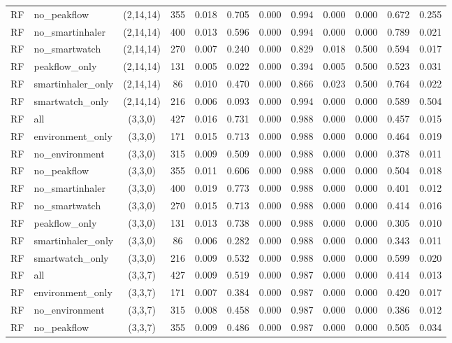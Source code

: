 \begin{longtable}{llcccccccccc}
RF & no\_peakflow & (2,14,14) & 355 & 0.018 & 0.705 & 0.000 & 0.994 & 0.000 & 0.000 & 0.672 & 0.255 \\
RF & no\_smartinhaler & (2,14,14) & 400 & 0.013 & 0.596 & 0.000 & 0.994 & 0.000 & 0.000 & 0.789 & 0.021 \\
RF & no\_smartwatch & (2,14,14) & 270 & 0.007 & 0.240 & 0.000 & 0.829 & 0.018 & 0.500 & 0.594 & 0.017 \\
RF & peakflow\_only & (2,14,14) & 131 & 0.005 & 0.022 & 0.000 & 0.394 & 0.005 & 0.500 & 0.523 & 0.031 \\
RF & smartinhaler\_only & (2,14,14) & 86 & 0.010 & 0.470 & 0.000 & 0.866 & 0.023 & 0.500 & 0.764 & 0.022 \\
RF & smartwatch\_only & (2,14,14) & 216 & 0.006 & 0.093 & 0.000 & 0.994 & 0.000 & 0.000 & 0.589 & 0.504 \\
RF & all & (3,3,0) & 427 & 0.016 & 0.731 & 0.000 & 0.988 & 0.000 & 0.000 & 0.457 & 0.015 \\
RF & environment\_only & (3,3,0) & 171 & 0.015 & 0.713 & 0.000 & 0.988 & 0.000 & 0.000 & 0.464 & 0.019 \\
RF & no\_environment & (3,3,0) & 315 & 0.009 & 0.509 & 0.000 & 0.988 & 0.000 & 0.000 & 0.378 & 0.011 \\
RF & no\_peakflow & (3,3,0) & 355 & 0.011 & 0.606 & 0.000 & 0.988 & 0.000 & 0.000 & 0.504 & 0.018 \\
RF & no\_smartinhaler & (3,3,0) & 400 & 0.019 & 0.773 & 0.000 & 0.988 & 0.000 & 0.000 & 0.401 & 0.012 \\
RF & no\_smartwatch & (3,3,0) & 270 & 0.015 & 0.713 & 0.000 & 0.988 & 0.000 & 0.000 & 0.414 & 0.016 \\
RF & peakflow\_only & (3,3,0) & 131 & 0.013 & 0.738 & 0.000 & 0.988 & 0.000 & 0.000 & 0.305 & 0.010 \\
RF & smartinhaler\_only & (3,3,0) & 86 & 0.006 & 0.282 & 0.000 & 0.988 & 0.000 & 0.000 & 0.343 & 0.011 \\
RF & smartwatch\_only & (3,3,0) & 216 & 0.009 & 0.532 & 0.000 & 0.988 & 0.000 & 0.000 & 0.599 & 0.020 \\
RF & all & (3,3,7) & 427 & 0.009 & 0.519 & 0.000 & 0.987 & 0.000 & 0.000 & 0.414 & 0.013 \\
RF & environment\_only & (3,3,7) & 171 & 0.007 & 0.384 & 0.000 & 0.987 & 0.000 & 0.000 & 0.420 & 0.017 \\
RF & no\_environment & (3,3,7) & 315 & 0.008 & 0.458 & 0.000 & 0.987 & 0.000 & 0.000 & 0.386 & 0.012 \\
RF & no\_peakflow & (3,3,7) & 355 & 0.009 & 0.486 & 0.000 & 0.987 & 0.000 & 0.000 & 0.505 & 0.034 \\

\end{longtable}
